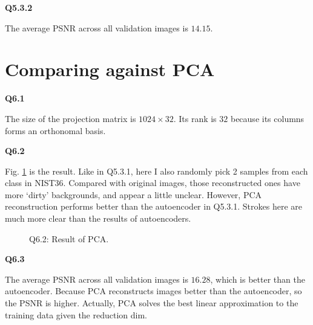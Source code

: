 \documentclass[
  course = {{16-720B Computer Vision}},
  quartile = {{1}},
  assignment = 3-Neural\ Networks\ for\ Recognition,
  name = {{Kangle Deng}},
  email = {{kangled@andrew.cmu.edu}},
  firstexercise = 1
]{aga-homework}
\begin{document}
\noindent \textbf{Q5.3.2}

The average PSNR across all validation images is $14.15$.

\section{Comparing against PCA}
\noindent \textbf{Q6.1}

The size of the projection matrix is $1024 \times 32$. Its rank is $32$ because its columns forms an orthonomal basis.

\noindent \textbf{Q6.2}

Fig. \ref{fig:cv_hw3_q62} is the result. Like in Q5.3.1, here I also randomly pick 2 samples from each class in NIST36. Compared with original images, those reconstructed ones have more `dirty' backgrounds, and appear a little unclear. However, PCA reconstruction performs better than the autoencoder in Q5.3.1. Strokes here are much more clear than the results of autoencoders.

\begin{figure}
    \centering
    \caption{Q6.2: Result of PCA.}
    \label{fig:cv_hw3_q62}
\end{figure}

\noindent \textbf{Q6.3}

The average PSNR across all validation images is $16.28$, which is better than the autoencoder. Because PCA reconstructs images better than the autoencoder, so the PSNR is higher. Actually, PCA solves the best linear approximation to the training data given the reduction dim.
\end{document}
